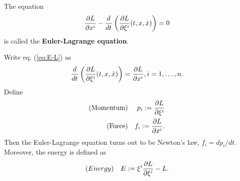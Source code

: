 \begin{definition}
	The equation
	\begin{eqnarray}
	\frac{ \partial L}{ \partial x^i } - \frac{d^{}  }{d t^{}}\left( \frac{ \partial L}{ \partial \xi^i }(t, x, \dot{x})  \right) = 0
	\label{eq:E-L}
	\end{eqnarray}
	is called the \textbf{Euler-Lagrange equation}.
\end{definition}

\begin{definition}
	Write eq. (\ref{eq:E-L}) as \[\frac{d^{}  }{d t^{}}\left( \frac{ \partial L}{ \partial \xi^i } (t, x, \dot{x}) \right) = \frac{ \partial L}{ \partial x^i }, i = 1, \dots, n.\]	Define
	\begin{eqnarray}
		\text{(Momentum)} && p_i := \frac{ \partial L}{ \partial \xi^i }\\
		\text{(Force)} && f_i := \frac{ \partial L}{ \partial x^i }.
	\end{eqnarray}
	Then the Euler-Lagrange equation turns out to be Newton's law, $f_i = dp_i/dt$. Moreover, the energy is defined as
	\begin{eqnarray}
		(Energy) && E := \xi^i \frac{ \partial L}{ \partial \xi^i } - L.
	\end{eqnarray}
\end{definition}

